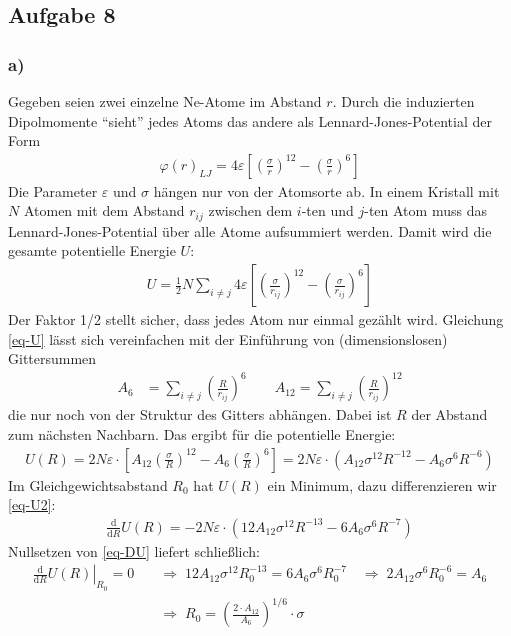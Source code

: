 \documentclass[11pt]{article}
\begin{document}
\subsection*{Aufgabe 8}
\subsubsection*{a)}
Gegeben seien zwei einzelne Ne-Atome im Abstand $r$. Durch die induzierten
Dipolmomente "`sieht"' jedes Atoms das andere als Lennard-Jones-Potential der Form
\begin{align}
  \varphi(r)_{LJ} = 4 \varepsilon \left[ \left(\frac{\sigma}{r}\right)^{12} -
    \left(\frac{\sigma}{r}\right)^{6} \right]
\end{align}
Die Parameter $\varepsilon$ und $\sigma$ hängen nur von der Atomsorte ab.
In einem Kristall mit $N$ Atomen mit dem Abstand $r_{ij}$ zwischen dem
$i$-ten und $j$-ten Atom muss das Lennard-Jones-Potential über alle Atome
aufsummiert werden. Damit wird die gesamte potentielle Energie $U$:
\begin{align}
\label{eq-U}
  U = \frac{1}{2} N \sum_{i \ne j} 4 \varepsilon
  \left[ \left(\frac{\sigma}{r_{ij}}\right)^{12} -
  \left(\frac{\sigma}{r_{ij}}\right)^{6} \right]
\end{align}
Der Faktor 1/2 stellt sicher, dass jedes Atom nur einmal gezählt wird.
Gleichung \eqref{eq-U} lässt sich vereinfachen mit der Einführung von
(dimensionslosen) Gittersummen
\begin{align*}
  A_6 & = \left . \sum_{i \ne j} \left(\frac{R}{r_{ij}}\right)^6 \right .\qquad
  A_{12} = \sum_{i \ne j} \left(\frac{R}{r_{ij}}\right)^{12}
\end{align*}
die nur noch von der Struktur des Gitters abhängen.  Dabei ist $R$ der Abstand
zum nächsten Nachbarn. Das ergibt für die potentielle Energie:
\begin{align}
\label{eq-U2}
  U(R) = 2 N \varepsilon \cdot \left[ A_{12} \left(\frac{\sigma}{R}\right)^{12} -
  A_6 \left(\frac{\sigma}{R}\right)^{6} \right] =
  2 N \varepsilon \cdot \left( A_{12} \sigma^{12} R^{-12} -
  A_6 \sigma^6 R^{-6} \right)
\end{align}
Im Gleichgewichtsabstand $R_0$ hat $U(R)$ ein Minimum, dazu differenzieren
wir \eqref{eq-U2}:
\begin{align}
\label{eq-DU}
  \frac{\mathrm{d}}{\mathrm{d} R} U(R) = - 2 N \varepsilon \cdot
    \left(12 A_{12} \sigma^{12} R^{-13} - 6 A_6 \sigma^6 R^{-7} \right)
\end{align}
Nullsetzen von \eqref{eq-DU} liefert schließlich:
\begin{align}
  \nonumber
  \left. \frac{\mathrm{d}}{\mathrm{d} R} U(R) \right|_{R_0} = 0 \quad& \Rightarrow\;
  12 A_{12} \sigma^{12} R_0^{-13} = 6 A_6 \sigma^6 R_0^{-7} \quad \Rightarrow\;
  2 A_{12} \sigma^6 R_0^{-6} = A_6 \\
  \label{eq-R0}
  \;& \Rightarrow\; R_0 = \left(\frac{2 \cdot A_{12}}{A_6}\right)^{1/6} \cdot \sigma
\end{align}
\end{document}
